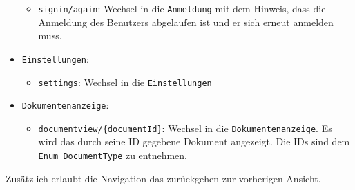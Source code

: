 \begin{itemize}
\begin{itemize}
        \item \texttt{signin/again}: Wechsel in die \texttt{Anmeldung} mit dem Hinweis, dass die Anmeldung des Benutzers abgelaufen ist und er sich erneut anmelden muss.
    \end{itemize}
    \item \texttt{Einstellungen}: 
    \begin{itemize}
        \item \texttt{settings}: Wechsel in die \texttt{Einstellungen}
    \end{itemize}
    \item \texttt{Dokumentenanzeige}: 
    \begin{itemize}
        \item \texttt{documentview/\{documentId\}}: Wechsel in die \texttt{Dokumentenanzeige}. 
        Es wird das durch seine ID gegebene Dokument angezeigt. Die IDs sind dem \texttt{Enum DocumentType} zu entnehmen.
    \end{itemize}
\end{itemize}
Zusätzlich erlaubt die Navigation das zurückgehen zur vorherigen Ansicht.


